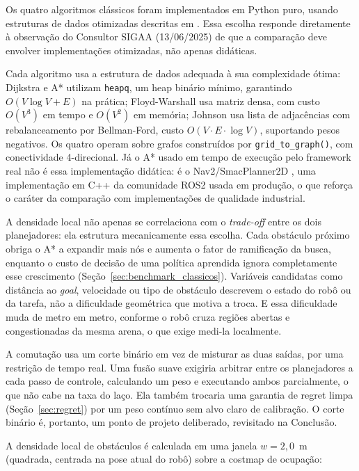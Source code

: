 \documentclass[12pt, a4paper]{article}
\begin{document}
Os quatro algoritmos clássicos foram implementados em Python puro, usando estruturas de dados
otimizadas descritas em \cite{Cormen2022}. Essa escolha responde diretamente à observação do
Consultor SIGAA (13/06/2025) de que a comparação deve envolver implementações otimizadas, não
apenas didáticas.

Cada algoritmo usa a estrutura de dados adequada à sua complexidade ótima: Dijkstra e A*
\cite{Hart1968} utilizam \texttt{heapq}, um heap binário mínimo, garantindo $O(V \log V + E)$ na
prática; Floyd-Warshall usa matriz densa, com custo $O(V^3)$ em tempo e $O(V^2)$ em memória;
Johnson usa lista de adjacências com rebalanceamento por Bellman-Ford, custo
$O(V \cdot E \cdot \log V)$, suportando pesos negativos. Os quatro operam sobre grafos
construídos por \texttt{grid\_to\_graph()}, com conectividade 4-direcional. Já o A* usado em
tempo de execução pelo framework real não é essa implementação didática: é o Nav2/SmacPlanner2D
\cite{Macenski2022}, uma implementação em C++ da comunidade ROS2 usada em produção, o que reforça
o caráter da comparação com implementações de qualidade industrial.

A densidade local não apenas se correlaciona com o \textit{trade-off} entre os dois
planejadores: ela estrutura mecanicamente essa escolha. Cada
obstáculo próximo obriga o A* a expandir mais nós e aumenta o fator de ramificação da busca,
enquanto o custo de decisão de uma política aprendida ignora completamente esse crescimento
(Seção~\ref{sec:benchmark_classicos}). Variáveis candidatas como distância ao \textit{goal},
velocidade ou tipo de obstáculo descrevem o estado do robô ou da tarefa, não a dificuldade
geométrica que motiva a troca. E essa dificuldade muda de metro em metro, conforme o robô cruza
regiões abertas e congestionadas da mesma arena, o que exige medi-la localmente.

A comutação usa um corte binário em vez de misturar as duas saídas, por uma restrição de tempo
real. Uma fusão suave exigiria arbitrar entre os planejadores
a cada passo de controle, calculando um peso e executando ambos parcialmente, o que não cabe na
taxa do laço. Ela também trocaria uma garantia de regret limpa (Seção~\ref{sec:regret}) por um
peso contínuo sem alvo claro de calibração. O corte binário é, portanto, um ponto de projeto
deliberado, revisitado na Conclusão.

A densidade local de obstáculos é calculada em uma janela $w = 2{,}0$~m (quadrada, centrada na
pose atual do robô) sobre a costmap de ocupação:
\end{document}
